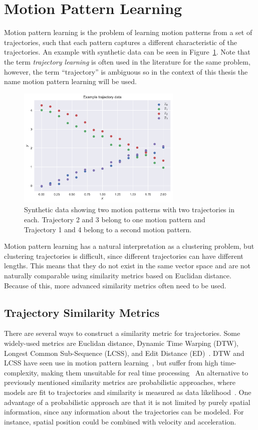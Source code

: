 \section{Motion Pattern Learning}
Motion pattern learning is the problem of learning motion patterns from a
set of trajectories, such that each pattern captures a different
characteristic of the trajectories. An example with synthetic data can be
seen in Figure~\ref{fig:motion-pattern-example}. Note that the term
\textit{trajectory learning} is often used in the literature for the
same problem, however, the term ``trajectory'' is ambiguous so in the
context of this thesis the name motion pattern learning will be used. 
\begin{figure}[H]
  \centering
  \includegraphics[width=0.7\textwidth]{figures/motion-pattern-example}
  \caption{Synthetic data showing two motion patterns with two trajectories in
    each. Trajectory 2 and 3 belong to one motion pattern and
    Trajectory 1 and 4 belong to a second motion pattern.}\label{fig:motion-pattern-example}
\end{figure}
Motion pattern learning has a natural interpretation as a
clustering problem, but clustering trajectories is difficult,
since different trajectories can have different lengths.
This means that they do not exist in the same vector space and are not
naturally comparable using similarity metrics based on Euclidan
distance. Because of this, more advanced similarity metrics often need to be used. 

\subsection{Trajectory Similarity Metrics}\label{sec:traj-sim-metrics}
There are several ways to construct a similarity metric for
trajectories. Some widely-used metrics are Euclidan distance,
Dynamic Time Warping (DTW), Longest Common Sub-Sequence (LCSS), and Edit
Distance (ED)~\cite{Wang2013Jan}. DTW and LCSS have seen use in
motion pattern learning~\cite{Tang2018Aug, Vlachos2002Feb}, but suffer
from high time-complexity, making them unsuitable for real time processing~\cite{Zhang2006Aug}
An alternative to previously mentioned similarity metrics are probabilistic
approaches, where models are fit to trajectories
and similarity is measured as data likelihood~\cite{Kim2011Nov, Tran2014Jun, Tiger2015Jul}.
One advantage of a probabilistic approach are that it is not limited by
purely spatial information, since any information about the trajectories can
be modeled. For instance, spatial position could be combined
with velocity and acceleration.

